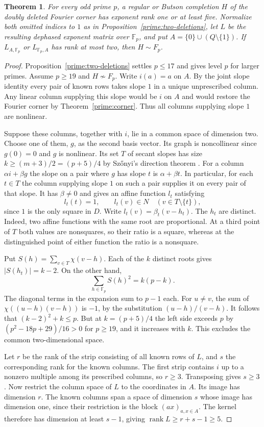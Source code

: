 \documentclass[11pt,a4paper]{article}
\newtheorem{theorem}{Theorem}[section]
\numberwithin{equation}{section}
\begin{document}
\begin{theorem}\label{prime:corner-rank}
For every odd prime $p$, a regular or Butson completion $H$ of the doubly deleted Fourier corner has exponent rank one or at least five. Normalize both omitted indices to $1$ as in Proposition~\ref{prime:two-deletions}, let $L$ be the resulting dephased exponent matrix over $\mathbb F_p$, and put $A=\{0\}\cup(Q\setminus\{1\})$. If $L_{A,\mathbb F_p}$ or $L_{\mathbb F_p,A}$ has rank at most two, then $H\sim F_p$.
\end{theorem}
\begin{proof}
Proposition~\ref{prime:two-deletions} settles $p\le17$ and gives level $p$ for larger primes. Assume $p\ge19$ and $H\not\sim F_p$. Write $i(a)=a$ on $A$. By the joint slope identity every pair of known rows takes slope $1$ in a unique unprescribed column. Any linear column supplying this slope would be $i$ on $A$ and would restore the Fourier corner by Theorem~\ref{prime:corner}. Thus all columns supplying slope $1$ are nonlinear.

Suppose these columns, together with $i$, lie in a common space of dimension two. Choose one of them, $g$, as the second basis vector. Its graph is noncollinear since $g(0)=0$ and $g$ is nonlinear. Its set $T$ of secant slopes has size $k\ge(m+3)/2=(p+5)/4$ by Sz\H{o}nyi's direction theorem \cite[Theorem~5.2]{szonyi}. For a column $\alpha i+\beta g$ the slope on a pair where $g$ has slope $t$ is $\alpha+\beta t$. In particular, for each $t\in T$ the column supplying slope $1$ on such a pair supplies it on every pair of that slope. It has $\beta\ne0$ and gives an affine function $l_t$ satisfying
$$l_t(t)=1,\qquad l_t(v)\in N\quad(v\in T\setminus\{t\}),$$
since $1$ is the only square in $D$. Write $l_t(v)=\beta_t(v-h_t)$. The $h_t$ are distinct. Indeed, two affine functions with the same root are proportional. At a third point of $T$ both values are nonsquares, so their ratio is a square, whereas at the distinguished point of either function the ratio is a nonsquare.

Put $S(h)=\sum_{v\in T}\chi(v-h)$. Each of the $k$ distinct roots gives $|S(h_t)|=k-2$. On the other hand,
$$\sum_{h\in\mathbb F_p}S(h)^2=k(p-k).$$
The diagonal terms in the expansion sum to $p-1$ each. For $u\ne v$, the sum of $\chi((u-h)(v-h))$ is $-1$, by the substitution $(u-h)/(v-h)$. It follows that $(k-2)^2+k\le p$. But at $k=(p+5)/4$ the left side exceeds $p$ by $(p^2-18p+29)/16>0$ for $p\ge19$, and it increases with $k$. This excludes the common two-dimensional space.

Let $r$ be the rank of the strip consisting of all known rows of $L$, and $s$ the corresponding rank for the known columns. The first strip contains $i$ up to a nonzero multiple among its prescribed columns, so $r\ge3$. Transposing gives $s\ge3$. Now restrict the column space of $L$ to the coordinates in $A$. Its image has dimension $r$. The known columns span a space of dimension $s$ whose image has dimension one, since their restriction is the block $(ax)_{a,x\in A}$. The kernel therefore has dimension at least $s-1$, giving $\operatorname{rank}L\ge r+s-1\ge5$.
\end{proof}
\end{document}
